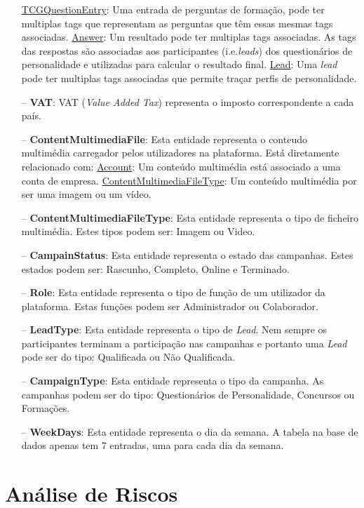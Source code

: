 \begin{itemize}
		\subitem \underline{TCGQuestionEntry}: Uma entrada de perguntas de formação, pode ter multiplas tags que representam as perguntas que têm essas mesmas tags associadas.
		\subitem \underline{Answer}: Um resultado pode ter multiplas tags associadas. As tags das respostas são associadas aos participantes (i.e.\textit{leads}) dos questionários de personalidade e utilizadas para calcular o resultado final.
		\subitem \underline{Lead}: Uma \textit{lead} pode ter multiplas tags associadas que permite traçar perfis de personalidade.
	\item[--] \textbf{VAT}: VAT (\textit{Value Added Tax}) representa o imposto correspondente a cada país.
	\item[--] \textbf{ContentMultimediaFile}: Esta entidade representa o conteudo multimédia carregador pelos utilizadores na plataforma. Está diretamente relacionado com:
		\subitem \underline{Account}: Um conteúdo multimédia está associado a uma conta de empresa.
		\subitem \underline{ContentMultimediaFileType}: Um conteúdo multimédia por ser uma imagem ou um vídeo.
	\item[--] \textbf{ContentMultimediaFileType}: Esta entidade representa o tipo de ficheiro multimédia. Estes tipos podem ser:  Imagem ou Video.
	\item[--] \textbf{CampainStatus}: Esta entidade representa o estado das campanhas. Estes estados podem ser: Rascunho, Completo, Online e Terminado.
	\item[--] \textbf{Role}: Esta entidade representa o tipo de função de um utilizador da plataforma. Estas funções podem ser Administrador ou Colaborador.
	\item[--] \textbf{LeadType}: Esta entidade representa o tipo de \textit{Lead}. Nem sempre os participantes terminam a participação nas campanhas e portanto uma \textit{Lead} pode ser do tipo: Qualificada ou Não Qualificada.
	\item[--] \textbf{CampaignType}: Esta entidade representa o tipo da campanha. As campanhas podem ser do tipo: Questionários de Personalidade, Concursos ou Formações. 
	\item[--] \textbf{WeekDays}: Esta entidade representa o dia da semana. A tabela na base de dados apenas tem 7 entradas, uma para cada dia da semana.
\end{itemize}



\section{Análise de Riscos}
\label{analiseriscos}

